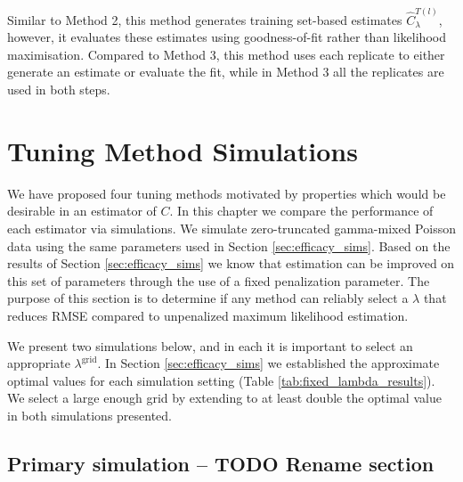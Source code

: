 \documentclass[oupdraft]{bio}
\newcommand{\lambdagrid}{\lambda^{\text{grid}}}
\begin{document}
Similar to Method 2, this method generates training set-based estimates $\widehat{C}^{T(l)}_{\lambda}$, however, it evaluates these estimates using goodness-of-fit rather than likelihood maximisation.
Compared to Method 3, this method uses each replicate to either generate an estimate or evaluate the fit, while in Method 3 all the replicates are used in both steps.

\section{Tuning Method Simulations}
\label{sec:tuning_simulations}

We have proposed four tuning methods motivated by properties which would be desirable in an estimator of $C$.  In this chapter we compare the performance of each estimator via simulations.
We simulate zero-truncated gamma-mixed Poisson data using the same parameters used in Section \ref{sec:efficacy_sims}.
Based on the results of Section \ref{sec:efficacy_sims} we know that estimation can be improved on this set of parameters through the use of a fixed penalization parameter.  The purpose of this section is to determine if any method can reliably select a $\lambda$ that reduces RMSE compared to unpenalized maximum likelihood estimation.




We present two simulations below, and in each it is important to select an appropriate $\lambdagrid$.
In Section \ref{sec:efficacy_sims}  we established the approximate optimal values for each simulation setting (Table \ref{tab:fixed_lambda_results}).
We select a large enough grid by extending to at least double the optimal value in both simulations presented.

\subsection{Primary simulation -- TODO Rename section}
\label{sec:tuning_simulation_1}
\end{document}

